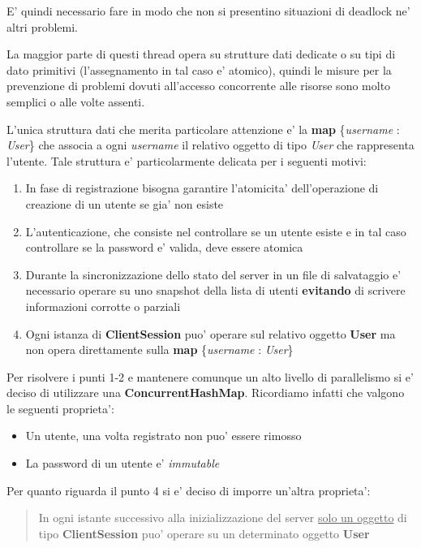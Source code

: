 E' quindi necessario fare in modo che non si presentino situazioni di deadlock ne' altri problemi.

La maggior parte di questi thread opera su strutture dati dedicate o su tipi di dato primitivi (l'assegnamento in tal caso e' atomico), quindi le misure per la prevenzione di problemi dovuti all'accesso concorrente alle risorse sono molto semplici o alle volte assenti.

L'unica struttura dati che merita particolare attenzione e' la \textbf{map} \{\emph{username} : \emph{User}\} che associa a ogni \emph{username} il relativo oggetto di tipo \emph{User} che rappresenta l'utente. Tale struttura e' particolarmente delicata per i seguenti motivi:
\begin{enumerate}
	\item In fase di registrazione bisogna garantire l'atomicita' dell'operazione di creazione di un utente se gia' non esiste
	\item L'autenticazione, che consiste nel controllare se un utente esiste e in tal caso controllare se la password e' valida, deve essere atomica
	\item Durante la sincronizzazione dello stato del server in un file di salvataggio e' necessario operare su uno snapshot della lista di utenti \textbf{evitando} di scrivere informazioni corrotte o parziali
	\item Ogni istanza di \textbf{ClientSession} puo' operare sul relativo oggetto \textbf{User} ma non opera direttamente sulla \textbf{map} \{\emph{username} : \emph{User}\}
\end{enumerate}

Per risolvere i punti 1-2 e mantenere comunque un alto livello di parallelismo si e' deciso di utilizzare una \textbf{ConcurrentHashMap}.
Ricordiamo infatti che valgono le seguenti proprieta':
\begin{itemize}
	\item Un utente, una volta registrato non puo' essere rimosso
	\item La password di un utente e' \emph{immutable}
\end{itemize}

Per quanto riguarda il punto 4 si e' deciso di imporre un'altra proprieta':
\begin{quote}
	 In ogni istante successivo alla inizializzazione del server \underline{solo un oggetto} di tipo \textbf{ClientSession} puo' operare su un determinato oggetto \textbf{User}
\end{quote}

